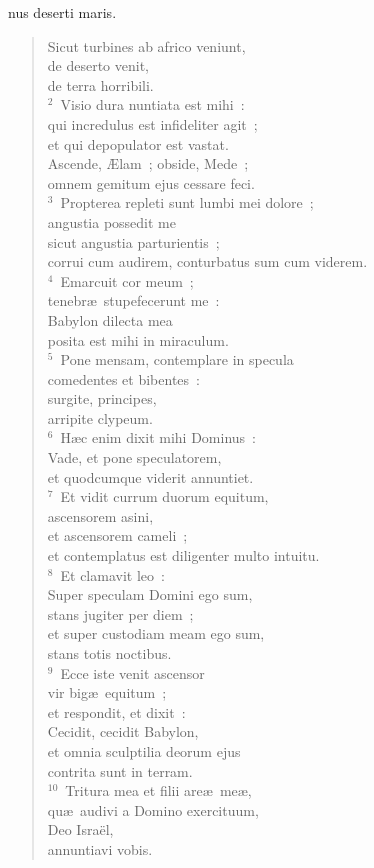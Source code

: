 \bchapter
{}nus deserti maris. \begin{verse}Sicut turbines ab africo veniunt,\\ de deserto venit,\\ de terra horribili.\\
${}^{2}$~Visio dura nuntiata est mihi~:\\ qui incredulus est infideliter agit~;\\ et qui depopulator est vastat.\\ Ascende, \AE lam~; obside, Mede~;\\ omnem gemitum ejus cessare feci.\\
${}^{3}$~Propterea repleti sunt lumbi mei dolore~;\\ angustia possedit me\\ sicut angustia parturientis~;\\ corrui cum audirem, conturbatus sum cum viderem.\\
${}^{4}$~Emarcuit cor meum~;\\ tenebr\ae\ stupefecerunt me~:\\ Babylon dilecta mea\\ posita est mihi in miraculum.\\
${}^{5}$~Pone mensam, contemplare in specula\\ comedentes et bibentes~:\\ surgite, principes,\\ arripite clypeum.\\
${}^{6}$~H\ae c enim dixit mihi Dominus~:\\ Vade, et pone speculatorem,\\ et quodcumque viderit annuntiet.\\
${}^{7}$~Et vidit currum duorum equitum,\\ ascensorem asini,\\ et ascensorem cameli~;\\ et contemplatus est diligenter multo intuitu.\\
${}^{8}$~Et clamavit leo~:\\ Super speculam Domini ego sum,\\ stans jugiter per diem~;\\ et super custodiam meam ego sum,\\ stans totis noctibus.\\
${}^{9}$~Ecce iste venit ascensor\\ vir big\ae\ equitum~;\\ et respondit, et dixit~:\\ Cecidit, cecidit Babylon,\\ et omnia sculptilia deorum ejus\\ contrita sunt in terram.\\
${}^{10}$~Tritura mea et filii are\ae\ me\ae ,\\ qu\ae\ audivi a Domino exercituum,\\ Deo Isra\"el,\\ annuntiavi vobis.\end{verse}


